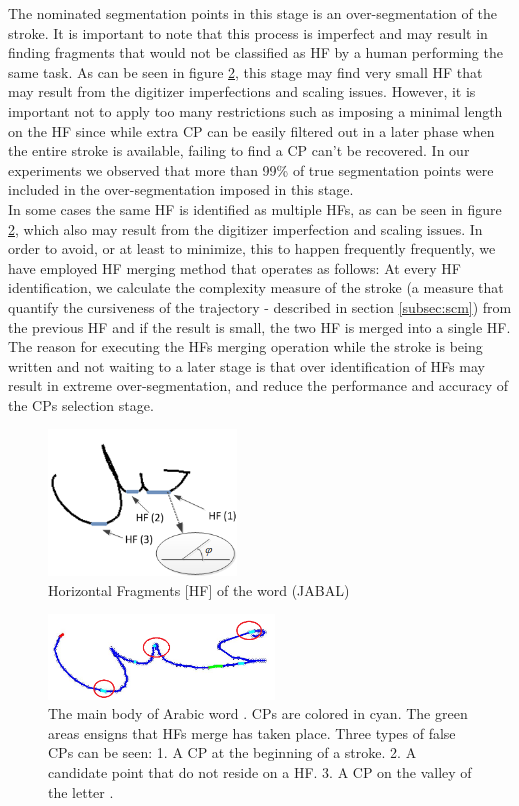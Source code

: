 \documentclass[journal,compsoc]{IEEEtran}
\begin{document}
The nominated segmentation points in this stage is an over-segmentation of the stroke. It is important to note that this process is imperfect and may result in finding fragments that would not be classified as HF by a human performing the same task. As can be seen in figure \ref{fig:candidate_in_no_horizontal}, this stage may find very small HF that may result from the digitizer imperfections and scaling issues. However, it is important not to apply too many restrictions such as imposing a minimal length on the HF since while extra CP can be easily filtered out in a later phase when the entire stroke is available, failing to find a CP can't be recovered. In our experiments we observed that more than 99\% of true segmentation points were included in the over-segmentation imposed in this stage.\\

In some cases the same HF is identified as multiple HFs, as can be seen in figure \ref{fig:candidate_in_no_horizontal}, which also may result from the digitizer imperfection and scaling issues. In order to avoid, or at least to minimize, this to happen frequently frequently, we have employed HF merging method that operates as follows: At every HF identification, we calculate the complexity measure of the stroke (a measure that quantify the cursiveness of the trajectory - described in section \ref{subsec:scm}) from the previous HF and if the result is small, the two HF is merged into a single HF. The reason for executing the HFs merging operation while the stroke is being written and not waiting to a later stage is that over identification of HFs may result in extreme over-segmentation, and reduce the performance and accuracy of the CPs selection stage.

\begin{figure}
\centering
\includegraphics[width=5cm]{./figures/horizontal_fragments}
\caption{Horizontal Fragments [HF] of the word (JABAL)}
\label{fig:horizontal_fragments}
\end{figure}

\begin{figure}
\centering
\includegraphics[width=6cm]{./figures/candidate_in_no_horizontal}
\caption{The main body of Arabic word . CPs are colored in cyan. The green areas ensigns that HFs merge has taken place. Three types of false CPs can be seen: 1. A CP at the beginning of a stroke. 2. A candidate point that do not reside on a HF. 3. A CP on the valley of the letter . }
\label{fig:candidate_in_no_horizontal}
\end{figure}
\end{document}
